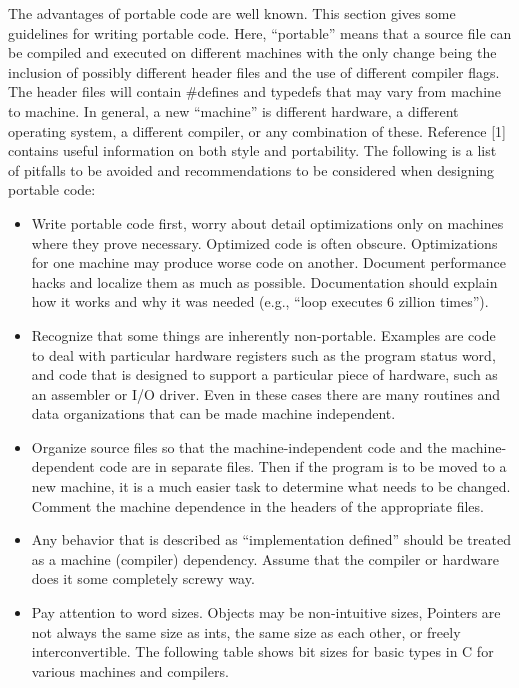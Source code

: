  The advantages of portable code are well known. This section gives some
guidelines for writing portable code. Here, ``portable'' means that a source
file can be compiled and executed on different machines with the only change
being the inclusion of possibly different header files and the use of different
compiler flags. The header files will contain \#defines and typedefs that may
vary from machine to machine. In general, a new ``machine'' is different
hardware, a different operating system, a different compiler, or any
combination of these. Reference [1] contains useful information on both style
and portability. The following is a list of pitfalls to be avoided and
recommendations to be considered when designing portable code: 
\begin{itemize}
\item Write portable code first, worry about detail optimizations only on
machines where they  prove necessary. Optimized code is often obscure.
Optimizations for one machine may  produce worse code on another. Document
performance hacks and localize them as much  as possible. Documentation should
explain how it works and why it was needed (e.g.,  ``loop executes 6 zillion
times''). 

\item Recognize that some things are inherently non-portable. Examples are code
to deal with particular hardware registers such as the program status word,
and code that is designed to support a particular piece of hardware, such as
an assembler or I/O driver. Even in these cases there are many routines and
data organizations that can be made machine independent.

\item Organize source files so that the machine-independent code and the
machine-dependent code are in separate files. Then if the program is to be
moved to a new machine, it is a much easier task to determine what needs to be
changed. Comment the machine dependence in the headers of the appropriate
files.

\item Any behavior that is described as ``implementation defined'' should be
treated as a machine (compiler) dependency. Assume that the compiler or
hardware does it some completely screwy way. 

\item Pay attention to word sizes. Objects may be non-intuitive sizes, Pointers
are not always the same size as ints, the same size as each other, or freely
interconvertible. The following table shows bit sizes for basic types in C
for various machines and compilers.


\end{itemize}
